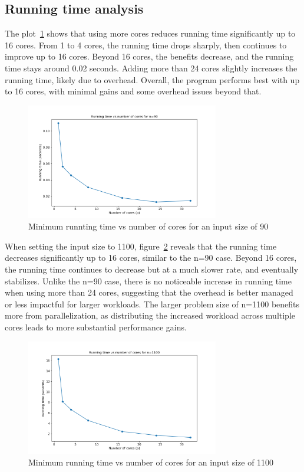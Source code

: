 \documentclass[a4paper,%
7pt,%
DIV12,
headsepline,%
headings=normal,
]{scrartcl}
\begin{document}
\subsection{Running time analysis}

The plot~\ref{fig:juliap_job_90} shows that using more cores reduces running time significantly up to 16 cores. From 1 to 4 cores, the running time drops sharply, then continues to improve up to 16 cores. Beyond 16 cores, the benefits decrease, and the running time stays around 0.02 seconds. Adding more than 24 cores slightly increases the running time, likely due to overhead. Overall, the program performs best with up to 16 cores, with minimal gains and some overhead issues beyond that.

\begin{figure}[htbp]
    \centering
    \includegraphics[width=0.75\textwidth]{./assets/juliap_job_90.png}
    \caption{Minimum runnting time vs number of cores for an input size of 90}
    \label{fig:juliap_job_90}
\end{figure}

\newpage
When setting the input size to 1100, figure~\ref{fig:juliap_job_1100} reveals that the running time decreases significantly up to 16 cores, similar to the n=90 case. Beyond 16 cores, the running time continues to decrease but at a much slower rate, and eventually stabilizes. Unlike the n=90 case, there is no noticeable increase in running time when using more than 24 cores, suggesting that the overhead is better managed or less impactful for larger workloads. The larger problem size of n=1100 benefits more from parallelization, as distributing the increased workload across multiple cores leads to more substantial performance gains.

\begin{figure}[htbp]
    \centering
    \includegraphics[width=0.75\textwidth]{./assets/juliap_job_1100.png}
    \caption{Minimum running time vs number of cores for an input size of 1100}
    \label{fig:juliap_job_1100}
\end{figure}
\end{document}
